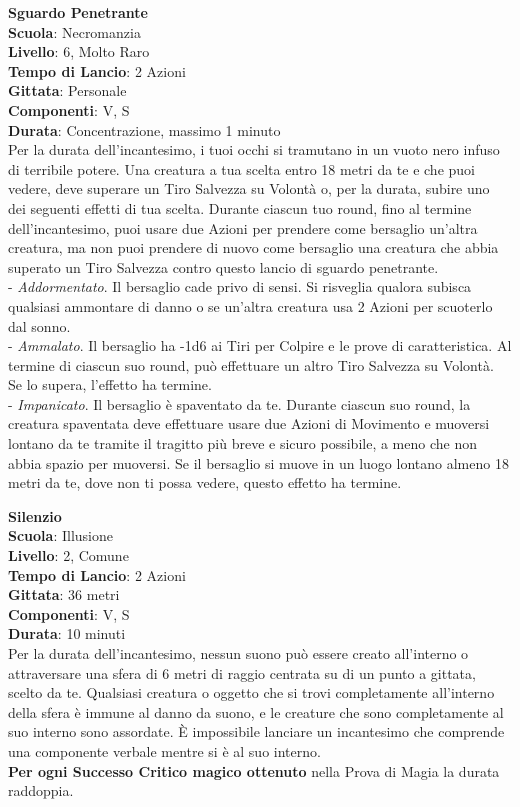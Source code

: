 \begin{multicols}{2}
\medskip\textbf{Sguardo Penetrante}\\
\textbf{Scuola}: Necromanzia\\
\textbf{Livello}: 6, Molto Raro\\
\textbf{Tempo di Lancio}: 2 Azioni\\
\textbf{Gittata}: Personale\\
\textbf{Componenti}: V, S\\
\textbf{Durata}: Concentrazione, massimo 1 minuto\\
Per la durata dell'incantesimo, i tuoi occhi si tramutano in un vuoto nero infuso di terribile potere. Una creatura a tua scelta entro 18 metri da te e che puoi vedere, deve superare un Tiro Salvezza su Volontà o, per la durata, subire uno dei seguenti effetti di tua scelta. Durante ciascun tuo round, fino al termine dell'incantesimo, puoi usare due Azioni per prendere come bersaglio un'altra creatura, ma non puoi prendere di nuovo come bersaglio una creatura che abbia superato un Tiro Salvezza contro questo lancio di sguardo penetrante.\\

- \textit{Addormentato}. Il bersaglio cade privo di sensi. Si risveglia qualora subisca qualsiasi ammontare di danno o se un'altra creatura usa 2 Azioni per scuoterlo dal sonno.\\
- \textit{Ammalato}. Il bersaglio ha -1d6 ai Tiri per Colpire e le prove di caratteristica. Al termine di ciascun suo round, può effettuare un altro Tiro Salvezza su Volontà. Se lo supera, l'effetto ha termine.\\
- \textit{Impanicato}. Il bersaglio è spaventato da te. Durante ciascun suo round, la creatura spaventata deve effettuare usare due Azioni di Movimento e muoversi lontano da te tramite il tragitto più breve e sicuro possibile, a meno che non abbia spazio per muoversi. Se il bersaglio si muove in un luogo lontano almeno 18 metri da te, dove non ti possa vedere, questo effetto ha termine.

\medskip\textbf{Silenzio}\\
\textbf{Scuola}: Illusione\\
\textbf{Livello}: 2, Comune\\
\textbf{Tempo di Lancio}: 2 Azioni\\
\textbf{Gittata}: 36 metri\\
\textbf{Componenti}: V, S\\
\textbf{Durata}: 10 minuti\\
Per la durata dell'incantesimo, nessun suono può essere creato all'interno o attraversare una sfera di 6 metri di raggio centrata su di un punto a gittata, scelto da te. Qualsiasi creatura o oggetto che si trovi completamente all'interno della sfera è immune al danno da suono, e le creature che sono completamente al suo interno sono assordate. È impossibile lanciare un incantesimo che comprende una componente verbale mentre si è al suo interno.\\
\textbf{Per ogni Successo Critico magico ottenuto} nella Prova di Magia la durata raddoppia.


\end{multicols}
